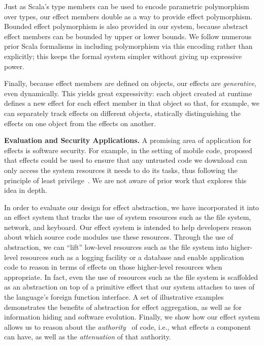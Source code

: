  Just as Scala's type members can be used to encode parametric polymorphism over types, our effect members double as a way to provide effect polymorphism. Bounded effect polymorphism is also provided in our system, because abstract effect members can be bounded by upper or lower bounds. We follow numerous prior Scala formalisms in including polymorphism via this encoding rather than explicitly; this keeps the formal system simpler without giving up expressive power.

Finally, because effect members are defined on objects, our effects are \textit{generative}, even dynamically.  This yields great expressivity: each object created at runtime defines a new effect for each effect member in that object so that, for example, we can separately track effects on different  objects, statically distinguishing the effects on one object from the effects on another.


\noindent\textbf{Evaluation and Security Applications.}  A promising area of application for effects is software security.  For example, in the setting of mobile code, \cite{turbak08} proposed that effects could be used to ensure that any untrusted code we download can only access the system resources it needs to do its tasks, thus following the principle of least privilege~\cite{denning76}.  We are not aware of prior work that explores this idea in depth.

In order to evaluate our design for effect abstraction, we have incorporated it into an effect system that tracks the use of system resources such as the file system, network, and keyboard.  Our effect system is intended to help developers reason about which source code modules use these resources.  Through the use of abstraction, we can ``lift'' low-level resources such as the file system into higher-level resources such as a logging facility or a database and enable application code to reason in terms of effects on those higher-level resources when appropriate.  In fact, even the use of resources such as the file system is scaffolded as an abstraction on top of a primitive  effect that our system attaches to uses of the language's foreign function interface.  A set of illustrative examples demonstrates the benefits of abstraction for effect aggregation, as well as for information hiding and software evolution.  Finally, we show how our effect system allows us to reason about the \textit{authority}~\cite{miller06} of code, i.e., what effects a component can have, as well as the \textit{attenuation} of that authority.

